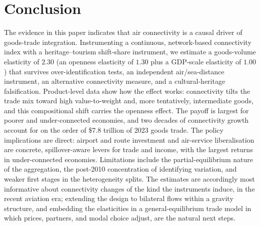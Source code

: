\section{Conclusion}
\label{sec:conclusion}
The evidence in this paper indicates that air connectivity is a causal driver
of goods-trade integration. Instrumenting a
continuous, network-based connectivity index with a heritage--tourism
shift-share instrument, we estimate a goods-volume elasticity of $2.30$ (an
openness elasticity of $1.30$ plus a GDP-scale elasticity of $1.00$) that
survives over-identification tests, an independent air/sea-distance instrument,
an alternative connectivity measure, and a cultural-heritage falsification.
Product-level data show how the effect works: connectivity tilts the trade mix
toward high value-to-weight and, more tentatively, intermediate goods, and
this compositional shift carries the openness effect. The payoff is largest for poorer and
under-connected economies, and two decades of connectivity growth account for
on the order of \$7.8 trillion of 2023 goods trade. The policy implications are
direct: airport and route investment and air-service liberalisation are
concrete, spillover-aware levers for trade and income, with the largest returns
in under-connected economies. Limitations include the partial-equilibrium nature of
the aggregation, the post-2010 concentration of identifying variation, and
weaker first stages in the heterogeneity splits. The estimates are
accordingly most informative about connectivity changes of the kind the
instruments induce, in the recent aviation era; extending the design to
bilateral flows within a gravity structure, and embedding the elasticities in
a general-equilibrium trade model in which prices, partners, and modal choice
adjust, are the natural next steps.

\appendix
